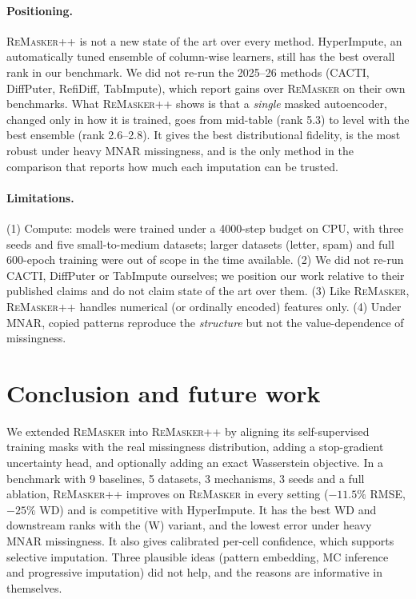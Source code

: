 \documentclass[11pt]{article}
\newcommand{\rmpp}{\textsc{ReMasker++}}
\newcommand{\remasker}{\textsc{ReMasker}}
\begin{document}
\paragraph{Positioning.} \rmpp{} is not a new state of the art over every method. HyperImpute, an automatically tuned ensemble of column-wise learners, still has the best overall rank in our benchmark. We did not re-run the 2025--26 methods (CACTI, DiffPuter, RefiDiff, TabImpute), which report gains over \remasker{} on their own benchmarks. What \rmpp{} shows is that a \emph{single} masked autoencoder, changed only in how it is trained, goes from mid-table (rank 5.3) to level with the best ensemble (rank 2.6--2.8). It gives the best distributional fidelity, is the most robust under heavy MNAR missingness, and is the only method in the comparison that reports how much each imputation can be trusted.

\paragraph{Limitations.} (1) Compute: models were trained under a 4000-step budget on CPU, with three seeds and five small-to-medium datasets; larger datasets (letter, spam) and full 600-epoch training were out of scope in the time available. (2) We did not re-run CACTI, DiffPuter or TabImpute ourselves; we position our work relative to their published claims and do not claim state of the art over them. (3) Like \remasker, \rmpp{} handles numerical (or ordinally encoded) features only. (4) Under MNAR, copied patterns reproduce the \emph{structure} but not the value-dependence of missingness.

\section{Conclusion and future work}
We extended \remasker{} into \rmpp{} by aligning its self-supervised training masks with the real missingness distribution, adding a stop-gradient uncertainty head, and optionally adding an exact Wasserstein objective. In a benchmark with 9 baselines, 5 datasets, 3 mechanisms, 3 seeds and a full ablation, \rmpp{} improves on \remasker{} in every setting ($-11.5\%$ RMSE, $-25\%$ WD) and is competitive with HyperImpute. It has the best WD and downstream ranks with the (W) variant, and the lowest error under heavy MNAR missingness. It also gives calibrated per-cell confidence, which supports selective imputation. Three plausible ideas (pattern embedding, MC inference and progressive imputation) did not help, and the reasons are informative in themselves.
\end{document}
